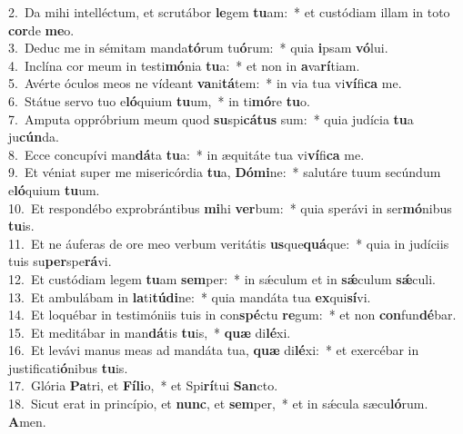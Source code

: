 {2.~}Da mihi intelléctum, et scrutábor \textbf{le}gem \textbf{tu}am:~* et custódiam illam in toto \textbf{cor}de \textbf{me}o.\\
{3.~}Deduc me in sémitam manda\textbf{tó}rum tu\textbf{ó}rum:~* quia \textbf{i}psam \textbf{vó}lui.\\
{4.~}Inclína cor meum in testi\textbf{mó}nia \textbf{tu}a:~* et non in \textbf{a}va\textbf{rí}tiam.\\
{5.~}Avérte óculos meos ne vídeant \textbf{va}ni\textbf{tá}tem:~* in via tua vi\textbf{ví}fi\textbf{ca} me.\\
{6.~}Státue servo tuo e\textbf{ló}quium \textbf{tu}um,~* in ti\textbf{mó}re \textbf{tu}o.\\
{7.~}Amputa oppróbrium meum quod \textbf{su}spi\textbf{cá}\textbf{tus} sum:~* quia judícia \textbf{tu}a ju\textbf{cún}da.\\
{8.~}Ecce concupívi man\textbf{dá}ta \textbf{tu}a:~* in æquitáte tua vi\textbf{ví}fi\textbf{ca} me.\\
{9.~}Et véniat super me misericórdia \textbf{tu}a, \textbf{Dó}\textbf{mi}ne:~* salutáre tuum secúndum e\textbf{ló}quium \textbf{tu}um.\\
{10.~}Et respondébo exprobrántibus \textbf{mi}hi \textbf{ver}bum:~* quia sperávi in ser\textbf{mó}nibus \textbf{tu}is.\\
{11.~}Et ne áuferas de ore meo verbum veritátis \textbf{us}que\textbf{quá}que:~* quia in judíciis tuis su\textbf{per}spe\textbf{rá}vi.\\
{12.~}Et custódiam legem \textbf{tu}am \textbf{sem}per:~* in sǽculum et in \textbf{sǽ}culum \textbf{sǽ}culi.\\
{13.~}Et ambulábam in \textbf{la}ti\textbf{tú}\textbf{di}ne:~* quia mandáta tua \textbf{ex}qui\textbf{sí}vi.\\
{14.~}Et loquébar in testimóniis tuis in con\textbf{spé}ctu \textbf{re}gum:~* et non \textbf{con}fun\textbf{dé}bar.\\
{15.~}Et meditábar in man\textbf{dá}tis \textbf{tu}is,~* \textbf{quæ} di\textbf{lé}xi.\\
{16.~}Et levávi manus meas ad mandáta tua, \textbf{quæ} di\textbf{lé}xi:~* et exercébar in justificati\textbf{ó}nibus \textbf{tu}is.\\
{17.~}Glória \textbf{Pa}tri, et \textbf{Fí}\textbf{li}o,~* et Spi\textbf{rí}tui \textbf{San}cto.\\
{18.~}Sicut erat in princípio, et \textbf{nunc}, et \textbf{sem}per,~* et in sǽcula sæcu\textbf{ló}rum. \textbf{A}men.\\
